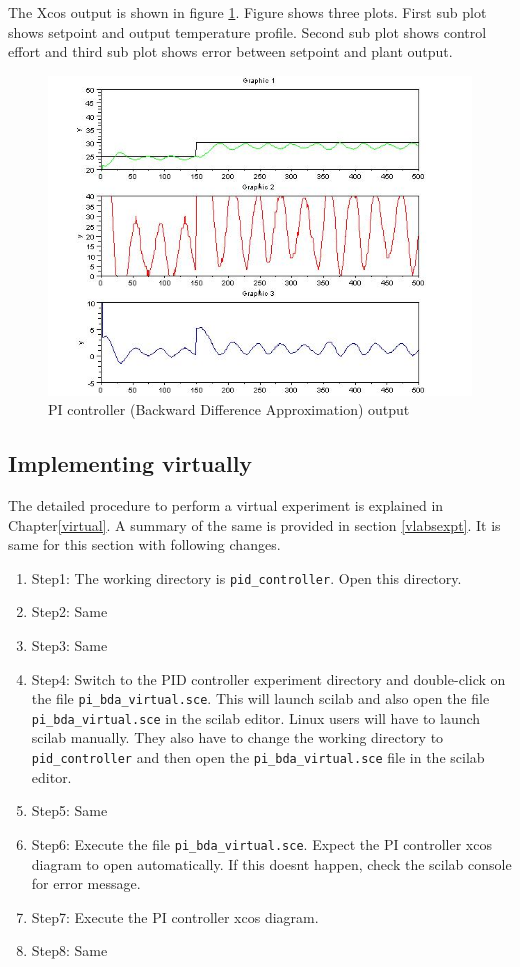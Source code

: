 The Xcos output is shown in figure \ref{pi_bda}.
Figure shows three plots. First sub plot shows setpoint and output temperature profile. 
Second sub plot shows control effort and third sub plot shows error between setpoint and plant output.


\begin{figure}
\centering
\includegraphics[width=0.6\linewidth]{pid_manual/pi_bda.jpg}
\caption{PI controller (Backward Difference Approximation) output}
\label{pi_bda}
\end{figure}

\subsection{Implementing virtually}

The detailed procedure to perform a virtual experiment is explained in Chapter\ref{virtual}. A summary of the same is provided in section \ref{vlabsexpt}. It is same for this section with following changes.

\begin{enumerate}
\item Step1: The working directory is {\tt  pid\_controller}. Open this directory.
\item Step2: Same
\item Step3: Same
\item Step4:  Switch to the PID controller experiment directory and double-click on the file {\tt pi\_bda\_virtual.sce}. This will launch scilab and also open the file {\tt pi\_bda\_virtual.sce} in the scilab editor. Linux users will have to launch scilab manually. They also have to change the working directory to {\tt pid\_controller} and then open the {\tt  pi\_bda\_virtual.sce} file in the scilab editor.
\item Step5: Same
\item Step6: Execute the file {\tt pi\_bda\_virtual.sce}.  Expect the PI controller xcos diagram to open automatically. If this doesnt happen, check the scilab console for error message.
\item Step7: Execute the PI controller xcos diagram.
\item Step8: Same
\end{enumerate}




